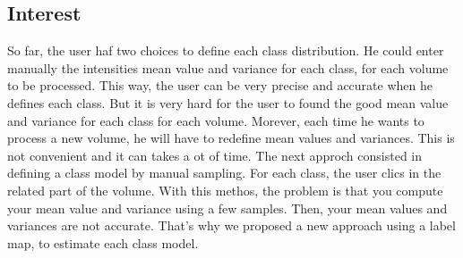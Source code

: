 \subsection{Interest}
%
So far, the user haf two choices to define each class distribution. He could enter manually the intensities mean value and variance for each class, for each volume to be processed. This way, the user can be very precise and accurate when he defines each class. But it is very hard for the user to found the good mean value and variance for each class for each volume. Morever, each time he wants to process a new volume, he will have to redefine mean values and variances. This is not convenient and it can takes a ot of time. The next approch consisted in defining a class model by manual sampling. For each class, the user clics in the related part of the volume. With this methos, the problem is that you compute your mean value and variance using a few samples. Then, your mean values and variances are not accurate. That's why we proposed a new approach using a label map, to estimate each class model.
%
